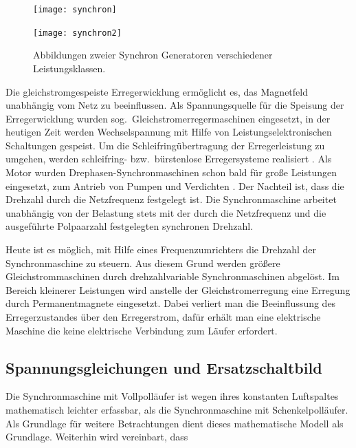 \begin{figure}[h!]
\centering
\begin{minipage}{6cm}
\texttt{[image: synchron]}
\end{minipage}
\hfill
\begin{minipage}{6cm}
\texttt{[image: synchron2]}
\end{minipage}
\caption{Abbildungen zweier Synchron Generatoren verschiedener Leistungsklassen.}
\label{fig:synchron-generatoren}
\end{figure}

Die gleichstromgespeiste Erregerwicklung ermöglicht es, das Magnetfeld unabhängig vom Netz zu beeinflussen.
Als Spannungsquelle für die Speisung der Erregerwicklung wurden sog.\ Gleichstromerregermaschinen eingesetzt, in der heutigen Zeit werden Wechselspannung mit Hilfe von Leistungselektronischen Schaltungen gespeist.
Um die Schleifringübertragung der Erregerleistung zu umgehen, werden schleifring- bzw.\ bürstenlose Erregersysteme realisiert \autocite{fischer2009}.
Als Motor wurden Drephasen-Synchronmaschinen schon bald für große Leistungen eingesetzt, \zB zum Antrieb von Pumpen und Verdichten \autocite[S.~486]{mullerI2005}.
Der Nachteil ist, dass die Drehzahl durch die Netzfrequenz festgelegt ist.
Die Synchronmaschine arbeitet unabhängig von der Belastung stets mit der durch die Netzfrequenz und die ausgeführte Polpaarzahl festgelegten synchronen Drehzahl.

Heute ist es möglich, mit Hilfe eines Frequenzumrichters die Drehzahl der Synchronmaschine zu steuern.
Aus diesem Grund werden größere Gleichstrommaschinen durch drehzahlvariable Synchronmaschinen abgelöst.
Im Bereich kleinerer Leistungen wird anstelle der Gleichstromerregung eine Erregung durch Permanentmagnete eingesetzt.
Dabei verliert man die Beeinflussung des Erregerzustandes über den Erregerstrom, dafür erhält man eine elektrische Maschine die keine elektrische Verbindung zum Läufer erfordert.

\subsection{Spannungsgleichungen und Ersatzschaltbild}\label{sec:spannungsgleichung-esb}

Die Synchronmaschine mit Vollpolläufer ist wegen ihres konstanten Luftspaltes mathematisch leichter erfassbar, als die Synchronmaschine mit Schenkelpolläufer.
Als Grundlage für weitere Betrachtungen dient dieses mathematische Modell als Grundlage.
Weiterhin wird vereinbart, dass

